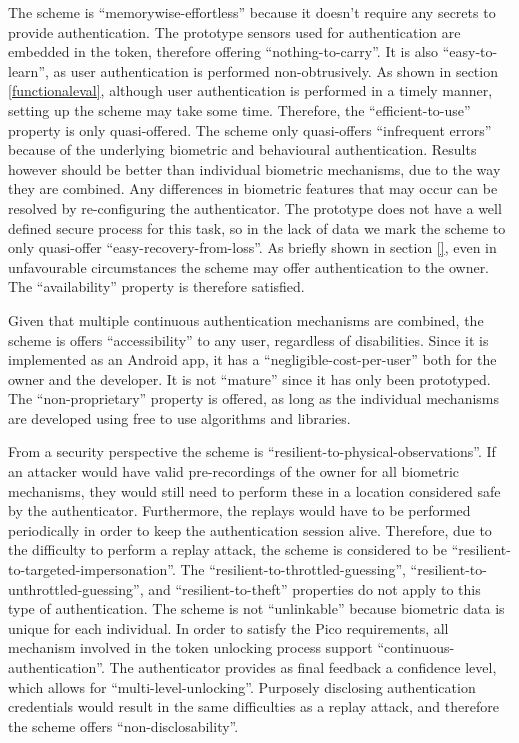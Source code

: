 The scheme is ``memorywise-effortless'' because it doesn't require any secrets to provide authentication. The prototype sensors used for authentication are embedded in the token, therefore offering ``nothing-to-carry''. It is also ``easy-to-learn'', as user authentication is performed non-obtrusively. As shown in section \ref{functionaleval}, although user authentication is performed in a timely manner, setting up the scheme may take some time. Therefore, the ``efficient-to-use'' property is only quasi-offered.  The scheme only quasi-offers ``infrequent errors'' because of the underlying biometric and behavioural authentication. Results however should be better than individual biometric mechanisms, due to the way they are combined. Any differences in biometric features that may occur can be resolved by re-configuring the authenticator. The prototype does not have a well defined secure process for this task, so in the lack of data we mark the scheme to only quasi-offer ``easy-recovery-from-loss''. As briefly shown in section \ref{}, even in unfavourable circumstances the scheme may offer authentication to the owner. The ``availability'' property is therefore satisfied.

Given that multiple continuous authentication mechanisms are combined, the scheme is offers ``accessibility'' to any user, regardless of disabilities. Since it is implemented as an Android app, it has a ``negligible-cost-per-user'' both for the owner and the developer. It is not ``mature'' since it has only been prototyped. The ``non-proprietary'' property is offered, as long as the individual mechanisms are developed using free to use algorithms and libraries.

From a security perspective the scheme is ``resilient-to-physical-observations''. If an attacker would have valid pre-recordings of the owner for all biometric mechanisms, they would still need to perform these in a location considered safe by the authenticator. Furthermore, the replays would have to be performed periodically in order to keep the authentication session alive. Therefore, due to the difficulty to perform a replay attack, the scheme is considered to be ``resilient-to-targeted-impersonation''. The ``resilient-to-throttled-guessing'', ``resilient-to-unthrottled-guessing'', and ``resilient-to-theft'' properties do not apply to this type of authentication. The scheme is not ``unlinkable'' because biometric data is unique for each individual. In order to satisfy the Pico requirements, all mechanism involved in the token unlocking process support ``continuous-authentication''. The authenticator provides as final feedback a confidence level, which allows for ``multi-level-unlocking''. Purposely disclosing authentication credentials would result in the same difficulties as a replay attack, and therefore the scheme offers ``non-disclosability''.


